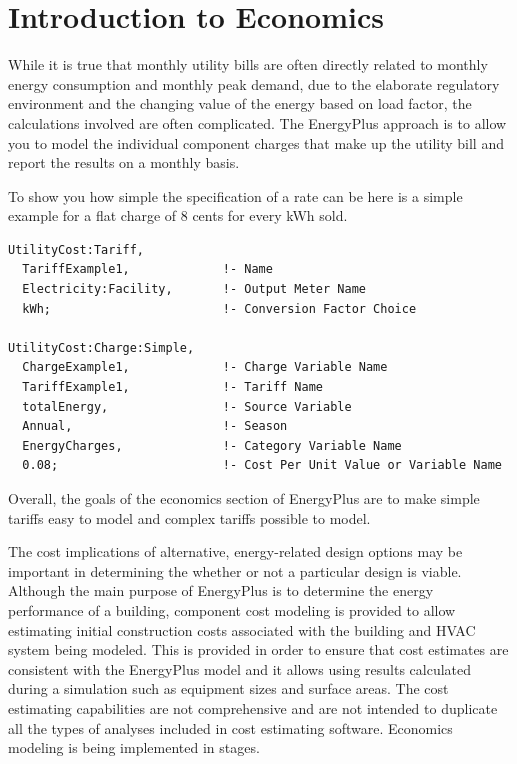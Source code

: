 \section{Introduction to Economics}\label{introduction-to-economics}

While it is true that monthly utility bills are often directly related to monthly energy consumption and monthly peak demand, due to the elaborate regulatory environment and the changing value of the energy based on load factor, the calculations involved are often complicated. The EnergyPlus approach is to allow you to model the individual component charges that make up the utility bill and report the results on a monthly basis.

To show you how simple the specification of a rate can be here is a simple example for a flat charge of 8 cents for every kWh sold.

\begin{lstlisting}
UtilityCost:Tariff,
  TariffExample1,             !- Name
  Electricity:Facility,       !- Output Meter Name
  kWh;                        !- Conversion Factor Choice

UtilityCost:Charge:Simple,
  ChargeExample1,             !- Charge Variable Name
  TariffExample1,             !- Tariff Name
  totalEnergy,                !- Source Variable
  Annual,                     !- Season
  EnergyCharges,              !- Category Variable Name
  0.08;                       !- Cost Per Unit Value or Variable Name
\end{lstlisting}

Overall, the goals of the economics section of EnergyPlus are to make simple tariffs easy to model and complex tariffs possible to model.

The cost implications of alternative, energy-related design options may be important in determining the whether or not a particular design is viable.
Although the main purpose of EnergyPlus is to determine the energy performance of a building, component cost modeling is provided to allow estimating initial construction costs associated with the building and HVAC system being modeled.
This is provided in order to ensure that cost estimates are consistent with the EnergyPlus model and it allows using results calculated during a simulation such as equipment sizes and surface areas.
The cost estimating capabilities are not comprehensive and are not intended to duplicate all the types of analyses included in cost estimating software.
Economics modeling is being implemented in stages.

